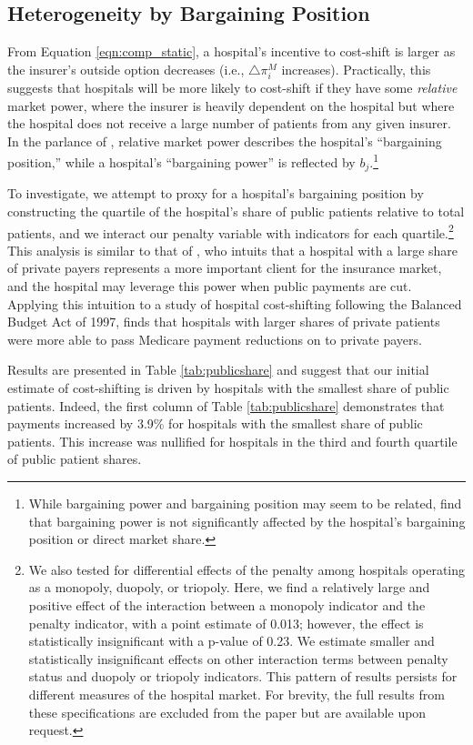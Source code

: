 \documentclass[12pt]{article}
\begin{document}
\subsection{Heterogeneity by Bargaining Position}
From Equation \ref{eqn:comp_static}, a hospital's incentive to cost-shift is larger as the insurer's outside option decreases (i.e., $\triangle \pi_{i}^{M}$ increases). Practically, this suggests that hospitals will be more likely to cost-shift if they have some \textit{relative} market power, where the insurer is heavily dependent on the hospital but where the hospital does not receive a large number of patients from any given insurer. In the parlance of \cite{lewis2015}, relative market power describes the hospital's ``bargaining position,'' while a hospital's ``bargaining power'' is reflected by $b_{j}$.\footnote{While bargaining power and bargaining position may seem to be related, \cite{lewis2015} find that bargaining power is not significantly affected by the hospital's bargaining position or direct market share.}

To investigate, we attempt to proxy for a hospital's bargaining position by constructing the quartile of the hospital's share of public patients relative to total patients, and we interact our penalty variable with indicators for each quartile.\footnote{We also tested for differential effects of the penalty among hospitals operating as a monopoly, duopoly, or triopoly. Here, we find a relatively large and positive effect of the interaction between a monopoly indicator and the penalty indicator, with a point estimate of 0.013; however, the effect is statistically insignificant with a p-value of 0.23. We estimate smaller and statistically insignificant effects on other interaction terms between penalty status and duopoly or triopoly indicators. This pattern of results persists for different measures of the hospital market. For brevity, the full results from these specifications are excluded from the paper but are available upon request.} This analysis is similar to that of \cite{wu2010}, who intuits that a hospital with a large share of private payers represents a more important client for the insurance market, and the hospital may leverage this power when public payments are cut. Applying this intuition to a study of hospital cost-shifting following the Balanced Budget Act of 1997, \cite{wu2010} finds that hospitals with larger shares of private patients were more able to pass Medicare payment reductions on to private payers.

Results are presented in Table \ref{tab:publicshare} and suggest that our initial estimate of cost-shifting is driven by hospitals with the smallest share of public patients. Indeed, the first column of Table \ref{tab:publicshare} demonstrates that payments increased by 3.9\% for hospitals with the smallest share of public patients. This increase was nullified for hospitals in the third and fourth quartile of public patient shares.
\end{document}
